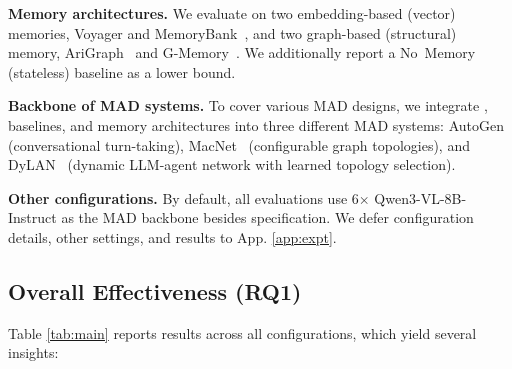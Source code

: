 
\textbf{Memory architectures.}
We evaluate on two embedding-based (vector) memories,
Voyager \citep{wang2023voyager} and
MemoryBank~\citep{zhong2024memorybank}, and two graph-based (structural) memory,
AriGraph~\citep{anokhin2024arigraph} and
G-Memory~\citep{zhang2025g}.  We additionally
report a No~Memory (stateless) baseline as a lower bound. 


\textbf{Backbone of MAD systems.}
To cover various MAD designs, we integrate \system, baselines, and memory architectures into three
different MAD systems:
AutoGen~\citep{wu2024autogen} (conversational
turn-taking),
MacNet~\citep{qian2024scaling} (configurable graph
topologies), and
DyLAN~\citep{liu2023dynamic} (dynamic LLM-agent
network with learned topology selection).


\textbf{Other configurations.} By default, all evaluations use 6$\times$ Qwen3-VL-8B-Instruct \citep{qwen3technicalreport} as the MAD backbone besides specification. We defer configuration details, other settings, and results to App. \ref{app:expt}.




\subsection{Overall Effectiveness (RQ1)}
\label{ssec:main-expt}



Table \ref{tab:main} reports results across all configurations, which yield several insights:

